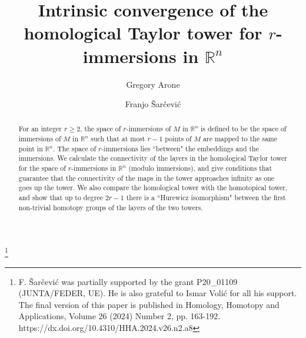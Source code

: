 \documentclass[12pt]{amsart}
\newcommand{\R}{{\mathbb R}}
\theoremstyle{plain}
\theoremstyle{definition}
\theoremstyle{remark}
\begin{document}
\pagestyle{plain}
\title{Intrinsic convergence of the homological Taylor tower for $r$-immersions in $\mathbb R^n$}

\author{Gregory Arone}
\address{Gregory Arone\newline Department of Mathematics, Stockholm University}

\author{Franjo \v Sar\v cevi\'c}
\address{Franjo \v Sar\v cevi\'c \newline Department of Mathematics, University of Sarajevo}

\thanks{ F. \v Sar\v cevi\'c was partially supported by the grant P20\_01109 (JUNTA/FEDER, UE). He is also grateful to Ismar Volić for all his support.\\The final version of this paper is published in Homology, Homotopy and Applications, Volume 26 (2024) Number 2, pp. 163-192. https://dx.doi.org/10.4310/HHA.2024.v26.n2.a8} 

\begin{abstract}
For an integer $r\ge 2$, the space of $r$-immersions of $M$ in $\R^n$ is defined to be the space of immersions of $M$ in $\R^n$ such that at most $r-1$ points of $M$ are mapped to the same point in $\R^n$. The space of $r$-immersions lies ``between" the embeddings and the immersions. We calculate the connectivity of the layers in the homological Taylor tower for the space of $r$-immersions in $\mathbb R^n$ (modulo immersions), and give conditions that guarantee that the connectivity of the maps in the tower approaches infinity as one goes up the tower. We also compare the homological tower with the homotopical tower, and show that up to degree $2r-1$ there is a ``Hurewicz isomorphism" between the first non-trivial homotopy groups of the layers of the two towers.
\end{abstract}

\maketitle
\end{document}
